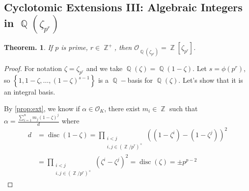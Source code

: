 \documentclass[11pt, a4paper]{memoir}
\DeclareMathOperator{\Q}{{\mathbb{Q}}}
\DeclareMathOperator{\Z}{{\mathbb{Z}}}
\theoremstyle{change}
\newtheorem{theorem}{Theorem.}[section]
\theoremstyle{plain}
\theoremstyle{nonumberplain}
\newtheorem{proof}{Proof}
\DeclareMathOperator{\disc}{disc}
\numberwithin{equation}{section}
\begin{document}
\subsection{Cyclotomic Extensions III: Algebraic Integers in \texorpdfstring{$\Q(\zeta_{p^r})$}{Qzpr}}
\begin{theorem}\label{thm:cepr}
    If $p$ is prime, $r\in\Z^+$, then $\mathcal{O}_{\Q(\zeta_{p^r})}=\Z[\zeta_{p^r}]$.
\end{theorem}
\begin{proof}
    For notation $\zeta=\zeta_{p^r}$ and we take $\Q(\zeta)=\Q(1-\zeta)$.
    Let $s=\phi(p^r)$, so $\left\{1,1-\zeta,\ldots,(1-\zeta)^{s-1}\right\}$ is a $\Q-$basis for $\Q(\zeta)$.
    Let's show that it is an integral basis.

    By \cref{prop:ext}, we know if $\alpha\in\mathcal{O}_K$, there exist $m_i\in\Z$ such that $\alpha=\frac{\sum_{i=1}^n m_j(1-\zeta)^j}{d}$ where
    \begin{align*}
        d &= \disc(1-\zeta)= \prod_{\substack{i<j\\i,j\in(\Z/p^r)^\times}}((1-\zeta^i)-(1-\zeta^j))^2\\
          &= \prod_{\substack{i<j\\i,j\in(\Z/p^r)^\times}}(\zeta^i-\zeta^j)^2= \disc(\zeta)=\pm p^{p-2}
    \end{align*}


\end{proof}
\end{document}
